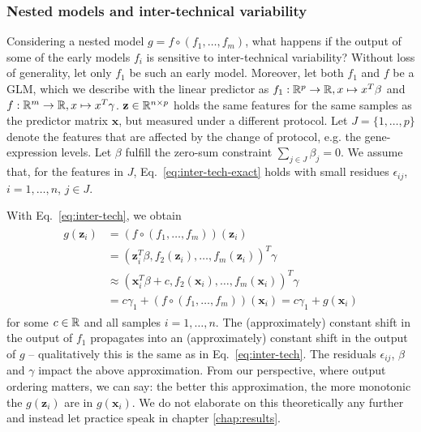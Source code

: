 \subsubsection{Nested models and inter-technical variability}

Considering a nested model $g = f \circ (f_1, \ldots, f_m)$, what happens if the output of some of 
the early models $f_i$ is sensitive to inter-technical variability? Without loss of generality, let 
only $f_1$ be such an early model. Moreover, let both $f_1$ and $f$ be a GLM, which we describe 
with the linear predictor as $f_1: \mathbb{R}^p \to \mathbb{R}, x \mapsto x^T \beta$ and $f: \mathbb{R}^m \to \mathbb{R}, 
x \mapsto x^T \gamma$. 
$\mathbf{z} \in \mathbb{R}^{n \times p}$ holds the same features for the same samples as the 
predictor matrix $\mathbf{x}$, but measured under a different protocol. Let $J = \{1, \ldots, p\}$ 
denote the features that are affected by the change of protocol, e.g. the gene-expression levels.
Let $\beta$ fulfill the zero-sum constraint $\sum_{j \in J} \beta_j = 0$.
We assume that, for the features in $J$, Eq.\ \eqref{eq:inter-tech-exact} holds with small residues 
$\epsilon_{ij}$, $i = 1, \ldots, n$, $j \in J$. 

With Eq.\ \eqref{eq:inter-tech}, we obtain
\begin{align}\label{eq:inter-tech-nested}
\begin{split}
    g(\mathbf{z}_i) &= (f \circ (f_1, \ldots, f_m))(\mathbf{z}_i) \\ 
    &= (\mathbf{z}_i^T \beta, f_2(\mathbf{z}_i), \ldots, f_m(\mathbf{z}_i))^T \gamma \\
    &\approx (\mathbf{x}_i^T \beta + c, f_2(\mathbf{x}_i), \ldots, f_m(\mathbf{x}_i))^T \gamma \\ 
    &= c \gamma_1 + (f \circ (f_1, \ldots, f_m))(\mathbf{x}_i) = c \gamma_1 + g(\mathbf{x}_i)
\end{split}
\end{align}
for some $c \in \mathbb{R}$ and all samples $i = 1, \ldots, n$. The (approximately) constant shift in the 
output of $f_1$ propagates into an (approximately) constant shift in the output of $g$ -- 
qualitatively this 
is the same as in Eq.\ \ref{eq:inter-tech}. The residuals $\epsilon_{ij}$, $\beta$ and $\gamma$ 
impact the above approximation. From our 
perspective, where output ordering matters, we can say: the better this approximation, the more 
monotonic the $g(\mathbf{z}_i)$ are in $g(\mathbf{x}_i)$. We do not elaborate on this theoretically
any further and instead let practice speak in chapter \ref{chap:results}.

